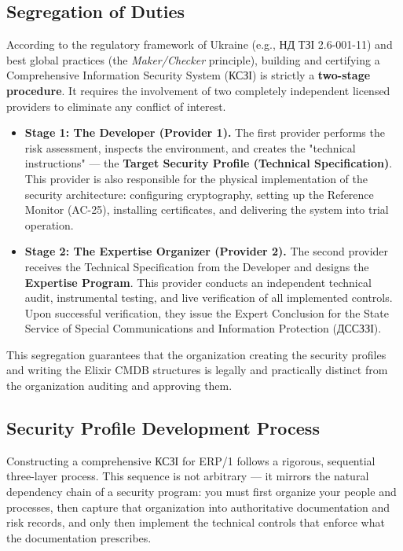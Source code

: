 \documentclass{article}
\begin{document}
\subsection{Segregation of Duties}
According to the regulatory framework of Ukraine (e.g., \foreignlanguage{ukrainian}{\foreignlanguage{ukrainian}{НД \foreignlanguage{ukrainian}{ТЗІ}} 2.6-001-11}) and best global practices (the \textit{Maker/Checker} principle), building and certifying a Comprehensive Information Security System (\foreignlanguage{ukrainian}{КСЗІ}) is strictly a \textbf{two-stage procedure}. It requires the involvement of two completely independent licensed providers to eliminate any conflict of interest.

\begin{itemize}
    \item \textbf{Stage 1: The Developer (Provider 1).} The first provider performs the risk assessment,
      inspects the environment, and creates the "technical instructions" --- the \textbf{Target Security Profile (Technical Specification)}.
      This provider is also responsible for the physical implementation of the security architecture: configuring cryptography,
      setting up the Reference Monitor (AC-25), installing certificates, and delivering the system into trial operation.
    \item \textbf{Stage 2: The Expertise Organizer (Provider 2).} The second provider receives the Technical Specification
      from the Developer and designs the \textbf{Expertise Program}. This provider conducts an independent technical audit,
      instrumental testing, and live verification of all implemented controls. Upon successful verification, they issue the
      Expert Conclusion for the State Service of Special Communications and Information Protection (\foreignlanguage{ukrainian}{ДССЗЗІ}).
\end{itemize}

This segregation guarantees that the organization creating the security profiles and writing the Elixir CMDB structures
is legally and practically distinct from the organization auditing and approving them.

\subsection{Security Profile Development Process}

Constructing a comprehensive \foreignlanguage{ukrainian}{КСЗІ} for ERP/1 follows a rigorous, sequential three-layer process.
This sequence is not arbitrary --- it mirrors the natural dependency chain of a security program: you must first organize
your people and processes, then capture that organization into authoritative documentation and risk records,
and only then implement the technical controls that enforce what the documentation prescribes.
\end{document}
